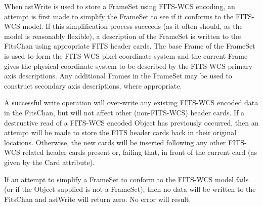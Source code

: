 \documentclass[twoside,11pt]{article}
\begin{document}
{{      When astWrite is used to store a FrameSet using FITS-WCS
      encoding, an attempt is first made to simplify the FrameSet to
      see if it conforms to the FITS-WCS model. If this simplification
      process succeeds (as it often should, as the model is reasonably
      flexible), a description of the FrameSet is written to the
      FitsChan using appropriate FITS header cards. The base Frame of
      the FrameSet is used to form the FITS-WCS pixel coordinate
      system and the current Frame gives the physical coordinate
      system to be described by the FITS-WCS primary axis
      descriptions.  Any additional Frames in the FrameSet may be used
      to construct secondary axis descriptions, where appropriate.

      A successful write operation will over-write any existing
      FITS-WCS encoded data in the FitsChan, but will not affect other
      (non-FITS-WCS) header cards. If a destructive read of a FITS-WCS
      encoded Object has previously occurred, then an attempt will be
      made to store the FITS header cards back in their original
      locations. Otherwise, the new cards will be inserted following
      any other FITS-WCS related header cards present or, failing
      that, in front of the current card (as given by the Card
      attribute).

      If an attempt to simplify a FrameSet to conform to the FITS-WCS
      model fails (or if the Object supplied is not a FrameSet), then
      no data will be written to the FitsChan and astWrite will
      return zero. No error will result.
   }
   }
\end{document}
